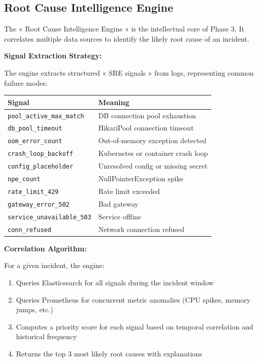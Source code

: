 \documentclass[12pt,a4paper]{report}
\begin{document}
\subsection{Root Cause Intelligence Engine}

The « Root Cause Intelligence Engine » is the intellectual core of Phase 3. It correlates multiple data sources to identify the likely root cause of an incident.

\textbf{Signal Extraction Strategy:}

The engine extracts structured « SRE signals » from logs, representing common failure modes:

\begin{center}
\begin{tabular}{|l|l|}
  \hline
  \textbf{Signal} & \textbf{Meaning} \\
  \hline
  \texttt{pool\_active\_max\_match} & DB connection pool exhaustion \\
  \texttt{db\_pool\_timeout} & HikariPool connection timeout \\
  \texttt{oom\_error\_count} & Out-of-memory exception detected \\
  \texttt{crash\_loop\_backoff} & Kubernetes or container crash loop \\
  \texttt{config\_placeholder} & Unresolved config or missing secret \\
  \texttt{npe\_count} & NullPointerException spike \\
  \texttt{rate\_limit\_429} & Rate limit exceeded \\
  \texttt{gateway\_error\_502} & Bad gateway \\
  \texttt{service\_unavailable\_503} & Service offline \\
  \texttt{conn\_refused} & Network connection refused \\
  \hline
\end{tabular}
\end{center}

\textbf{Correlation Algorithm:}

For a given incident, the engine:
\begin{enumerate}
  \item Queries Elasticsearch for all signals during the incident window
  \item Queries Prometheus for concurrent metric anomalies (CPU spikes, memory jumps, etc.)
  \item Computes a priority score for each signal based on temporal correlation and historical frequency
  \item Returns the top 3 most likely root causes with explanations
\end{enumerate}
\end{document}
